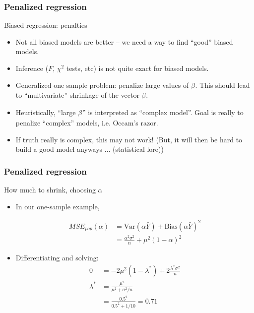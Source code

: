 \documentclass[handout]{beamer}
\newcommand{\B}[1]{\beta_{#1}}
\newcommand{\V}{\text{Var}}
\begin{document}

   \begin{frame} \frametitle{Penalized regression}

   \begin{block}
   {Biased regression: penalties                     }
       \begin{itemize}[<+->]

       \item Not all biased models are better -- we need a way to find ``good'' biased models.

       \item Inference ($F$, $\chi^2$ tests, etc) is not quite exact for  biased models.

       \item Generalized one sample problem: penalize large values of $\B{}$.
       This should lead to ``multivariate'' shrinkage of the vector  $\B{}$.
       \item Heuristically, ``large $\B{}$'' is interpreted as ``complex model''. Goal is really to penalize ``complex'' models, i.e. Occam's razor.

       \item If truth  really is complex, this may not work! (But, it will then be hard to build a good model anyways ... (statistical lore))

       \end{itemize}

   \end{block}
   \end{frame}


   \begin{frame} \frametitle{Penalized regression}

   \begin{block}
         {How much to shrink, choosing $\alpha$}
         \begin{itemize}
         \item In our one-sample example,

   $$
   \begin{aligned}
   MSE_{pop}(\alpha) &= \V( \alpha \bar{Y}) + \text{Bias}(\alpha \bar{Y})^2 \\
   &= \frac{\alpha^2 \sigma^2}{n} + \mu^2 (1 - \alpha)^2
   \end{aligned}
   $$

   \item Differentiating and solving:
   $$
   \begin{aligned}
   0 &= -2 \mu^2(1 - \lambda^*) + 2 \frac{\lambda^* \sigma^2}{n}  \\
   \lambda^* & = \frac{\mu^2}{\mu^2+\sigma^2/n} \\
   &= \frac{0.5^2}{0.5^2+1/10} = 0.71
   \end{aligned}
   $$
         \end{itemize}
   \end{block}
   \end{frame}
\end{document}
